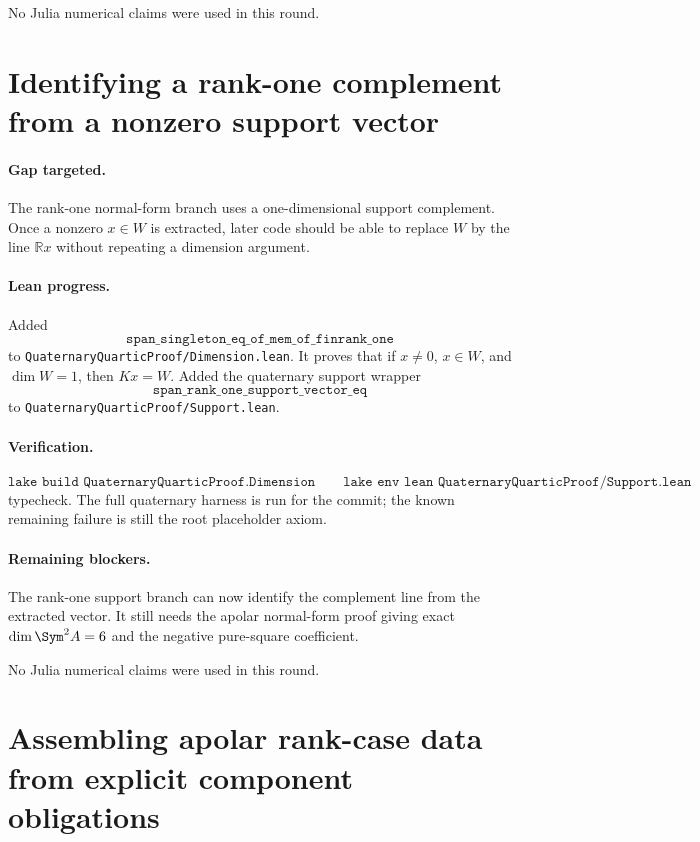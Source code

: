 \documentclass[11pt]{article}
\begin{document}
No Julia numerical claims were used in this round.

\section*{Identifying a rank-one complement from a nonzero support vector}

\paragraph{Gap targeted.}
The rank-one normal-form branch uses a one-dimensional support complement.
Once a nonzero \(x\in W\) is extracted, later code should be able to replace
\(W\) by the line \(\mathbb{R}x\) without repeating a dimension argument.

\paragraph{Lean progress.}
Added
\[
\texttt{span\_singleton\_eq\_of\_mem\_of\_finrank\_one}
\]
to \texttt{QuaternaryQuarticProof/Dimension.lean}.  It proves that if
\(x\ne0\), \(x\in W\), and \(\dim W=1\), then \(Kx=W\).  Added the
quaternary support wrapper
\[
\texttt{span\_rank\_one\_support\_vector\_eq}
\]
to \texttt{QuaternaryQuarticProof/Support.lean}.

\paragraph{Verification.}
\[
\texttt{lake build QuaternaryQuarticProof.Dimension}
\qquad
\texttt{lake env lean QuaternaryQuarticProof/Support.lean}
\]
typecheck.  The full quaternary harness is run for the commit; the known
remaining failure is still the root placeholder axiom.

\paragraph{Remaining blockers.}
The rank-one support branch can now identify the complement line from the
extracted vector.  It still needs the apolar normal-form proof giving exact
\(\dim\Sym^2A=6\) and the negative pure-square coefficient.

No Julia numerical claims were used in this round.

\section*{Assembling apolar rank-case data from explicit component obligations}
\end{document}
